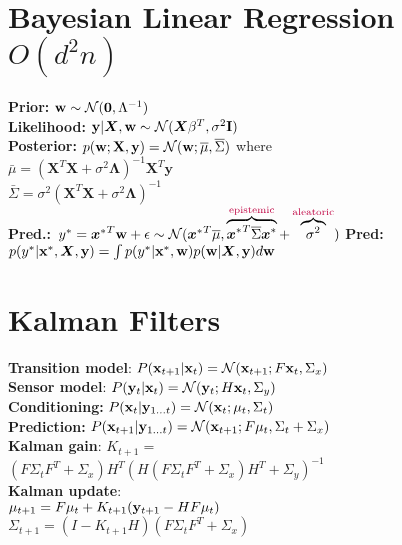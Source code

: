 \section{Bayesian Linear Regression $O(d^2n)$}
\textbf{Prior:} ${\mathbf{w}}\sim\mathcal{N}(\mathbf{0},\Lambda^{-1})$\\
\textbf{Likelihood:} ${\mathbf{y}}|{\bm{X}},{\mathbf{w}}\sim\mathcal{N}({\bm{X}}\beta^T,\sigma^2\mathbf{I})$\\
\textbf{Posterior:} $p({\mathbf{w}};\mathbf{X},\mathbf{y}) = \mathcal{N}({\mathbf{w}}; \overline\mu, \overline\Sigma)$ where\\
$\bar\mu = (\mathbf{X}^T\mathbf{X} +\sigma^2\bm{\Lambda})^{-1}\mathbf{X}^T\mathbf{y}$\\
\vspace*{-2em}
$\bar\Sigma = \sigma^2(\mathbf{X}^T\mathbf{X} +\sigma^2\bm{\Lambda})^{-1}$\\
\mbox{\textbf{Pred.:}
$y^* = {{\bm{x}}^*}^T{\mathbf{w}} + \epsilon\sim \mathcal{N}({{\bm{x}}^*}^T\overline\mu, \overbrace{{{\bm{x}}^*}^T\overline\Sigma{{\bm{x}}^*}}^\text{\color{purple}epistemic}+\overbrace{\sigma^2}^\text{\color{purple}aleatoric})$}
\textbf{\color{gray}Pred:}
$p(y^*|{\mathbf{x}}^*,{\bm{X}},{\mathbf{y}}) = \int p(y^*|{\mathbf{x}}^*,{\mathbf{w}})p({\mathbf{w}}|{\bm{X}},{\mathbf{y}}) d{\mathbf{w}}$

\section{Kalman Filters}
\textbf{Transition model}:
\mbox{$P({\mathbf{x}}_{t+1}|{\mathbf{x}}_t)=\mathcal{N}({\mathbf{x}}_{t+1};F{\mathbf{x}}_t, \Sigma_x)$}\\
\textbf{Sensor model}:
$P({\mathbf{y}}_{t}|{\mathbf{x}}_t)=\mathcal{N}({\mathbf{y}}_{t};H{\mathbf{x}}_t, \Sigma_y)$\\
\textbf{Conditioning:} $P({\mathbf{x}}_t|{\mathbf{y}}_{1\ldots t}) = \mathcal{N}({\mathbf{x}}_t;\mu_t, \Sigma_t)$\\
\textbf{Prediction:} $P({\mathbf{x}}_{t+1}|{\mathbf{y}}_{1\ldots t}) = \mathcal{N}({\mathbf{x}}_{t+1};F\mu_t, \Sigma_t + \Sigma_x)$\\
\textbf{Kalman gain}:
$K_{t+1}=$\\$(F\Sigma_t F^T+\Sigma_x)H^T(H(F\Sigma_t F^T+\Sigma_x)H^T+ \Sigma_y)^{-1}$\\
\textbf{Kalman update}:\\
$\mu_{t+1}=F\mu_t+K_{t+1}({\mathbf{y}}_{t+1}-HF\mu_t)$\\
$\Sigma_{t+1}=(I-K_{t+1}H)(F\Sigma_tF^T + \Sigma_x)$\\

